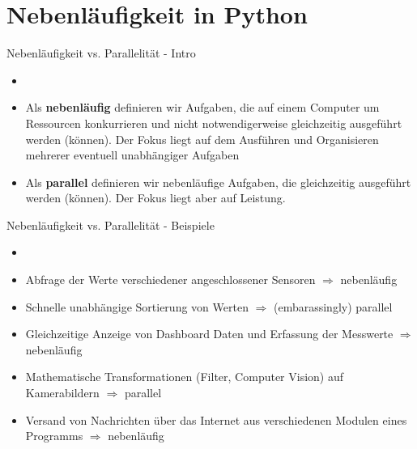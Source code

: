 \section{Nebenläufigkeit in Python}

\begin{frame}{Nebenläufigkeit vs. Parallelität - Intro}
        \begin{itemize}
        \setlength{\itemindent}{2.0in}
        \item [\textbf{Definition: Nebenläufig vs. Parallel}]
    \end{itemize}

    \begin{itemize}
        \item Als \textbf{nebenläufig} definieren wir Aufgaben, die auf einem Computer um Ressourcen konkurrieren und nicht notwendigerweise gleichzeitig ausgeführt werden (können). Der Fokus liegt auf dem Ausführen und Organisieren mehrerer eventuell unabhängiger Aufgaben
        \item Als \textbf{parallel} definieren wir nebenläufige Aufgaben, die gleichzeitig ausgeführt werden (können). Der Fokus liegt aber auf Leistung.
     \end{itemize}
\end{frame}

\begin{frame}{Nebenläufigkeit vs. Parallelität - Beispiele}
        \begin{itemize}
        \setlength{\itemindent}{2.2in}
        \item [\textbf{Beispiele: Nebenläufig oder Parallel?}]
    \end{itemize}

    \begin{itemize}
        \item Abfrage der Werte verschiedener angeschlossener Sensoren $\Rightarrow$ nebenläufig
        \item Schnelle unabhängige Sortierung von Werten $\Rightarrow$ (embarassingly) parallel
        \item Gleichzeitige Anzeige von Dashboard Daten und Erfassung der Messwerte $\Rightarrow$ nebenläufig
        \item Mathematische Transformationen (Filter, Computer Vision) auf Kamerabildern  $\Rightarrow$ parallel %
        \item Versand von Nachrichten über das Internet aus verschiedenen Modulen eines Programms  $\Rightarrow$ nebenläufig
     \end{itemize}
\end{frame}

